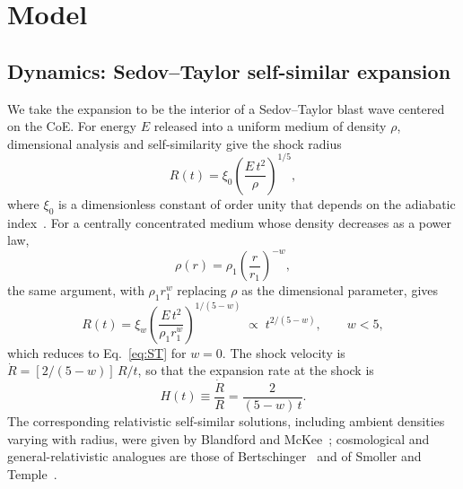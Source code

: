 \documentclass[11pt,letterpaper]{article}
\numberwithin{equation}{section}
\begin{document}
\section{Model}
\label{sec:model}

\subsection{Dynamics: Sedov--Taylor self-similar expansion}
\label{sec:dynamics}

We take the expansion to be the interior of a Sedov--Taylor blast wave centered
on the CoE. For energy $E$ released into a uniform medium of density $\rho$,
dimensional analysis and self-similarity give the shock radius
\begin{equation}
  R(t) = \xi_0\left(\frac{E\,t^2}{\rho}\right)^{1/5},
  \label{eq:ST}
\end{equation}
where $\xi_0$ is a dimensionless constant of order unity that depends on the
adiabatic index~\citep{Sedov1946,Taylor1950}. For a centrally concentrated
medium whose density decreases as a power law,
\begin{equation}
  \rho(r) = \rho_1\left(\frac{r}{r_1}\right)^{-w},
  \label{eq:rhow}
\end{equation}
the same argument, with $\rho_1 r_1^{w}$ replacing $\rho$ as the dimensional
parameter, gives
\begin{equation}
  R(t) = \xi_w\left(\frac{E\,t^2}{\rho_1 r_1^{w}}\right)^{1/(5-w)}
  \;\propto\; t^{2/(5-w)},
  \qquad w<5 ,
  \label{eq:STw}
\end{equation}
which reduces to Eq.~\eqref{eq:ST} for $w=0$. The shock velocity is
$\dot R=[2/(5-w)]\,R/t$, so that the expansion rate at the shock is
\begin{equation}
  H(t) \equiv \frac{\dot R}{R} = \frac{2}{(5-w)\,t}.
  \label{eq:Hst}
\end{equation}
The corresponding relativistic self-similar solutions, including ambient
densities varying with radius, were given by Blandford and
McKee~\citep{BlandfordMcKee1976}; cosmological and general-relativistic
analogues are those of Bertschinger~\citep{Bertschinger1983} and of Smoller and
Temple~\citep{SmollerTemple2000,SmollerTemple2003}.
\end{document}

